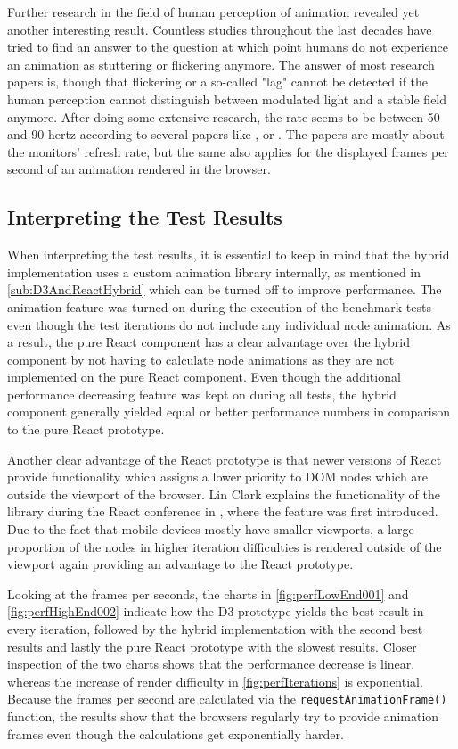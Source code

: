 Further research in the field of human perception of animation revealed yet another interesting result. Countless studies throughout the last decades have tried to find an answer to the question at which point humans do not experience an animation as stuttering or flickering anymore. The answer of most research papers is, though that flickering or a so-called "lag" cannot be detected if the human perception cannot distinguish between modulated light and a stable field anymore. After doing some extensive research, the rate seems to be between 50 and 90 hertz according to several papers like \cite{6375944}, \cite{farrell1987predicting} or \cite{stereoscopicFlickerArticle}. The papers are mostly about the monitors' refresh rate, but the same also applies for the displayed frames per second of an animation rendered in the browser.

\subsection{Interpreting the Test Results}

When interpreting the test results, it is essential to keep in mind that the hybrid implementation uses a custom animation library internally, as mentioned in \ref{sub:D3AndReactHybrid} which can be turned off to improve performance. The animation feature was turned on during the execution of the benchmark tests even though the test iterations do not include any individual node animation. As a result, the pure React component has a clear advantage over the hybrid component by not having to calculate node animations as they are not implemented on the pure React component. Even though the additional performance decreasing feature was kept on during all tests, the hybrid component generally yielded equal or better performance numbers in comparison to the pure React prototype.

Another clear advantage of the React prototype is that newer versions of React provide functionality which assigns a lower priority to DOM nodes which are outside the viewport of the browser. Lin Clark explains the functionality of the library during the React conference in \cite{ReactReconcliliationVideo}, where the feature was first introduced. Due to the fact that mobile devices mostly have smaller viewports, a large proportion of the nodes in higher iteration difficulties is rendered outside of the viewport again providing an advantage to the React prototype.

Looking at the frames per seconds, the charts in \ref{fig:perfLowEnd001} and \ref{fig:perfHighEnd002} indicate how the D3 prototype yields the best result in every iteration, followed by the hybrid implementation with the second best results and lastly the pure React prototype with the slowest results. Closer inspection of the two charts shows that the performance decrease is linear, whereas the increase of render difficulty in \ref{fig:perfIterations} is exponential. Because the frames per second are calculated via the \texttt{requestAnimationFrame()} function, the results show that the browsers regularly try to provide animation frames even though the calculations get exponentially harder.

